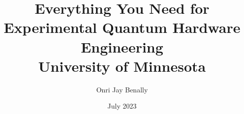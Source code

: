\documentclass{report}
\title{\Huge\textbf{Everything You Need for Experimental Quantum Hardware Engineering}\\
{\LARGE University of Minnesota}}
\author{\Large{Onri Jay Benally}}
\date{July 2023}
\begin{document}
\maketitle



\tableofcontents{








}
\end{document}
